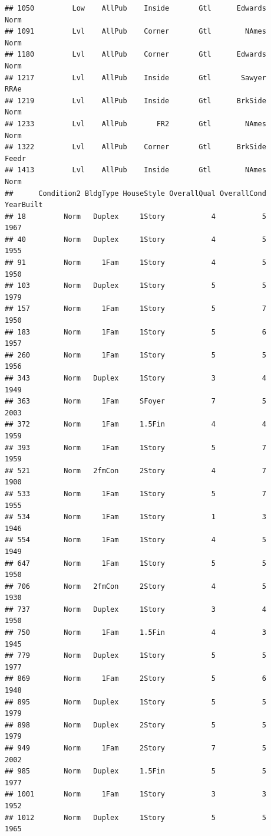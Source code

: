 \documentclass[]{article}
\begin{document}
\begin{verbatim}
## 1050         Low    AllPub    Inside       Gtl      Edwards       Norm
## 1091         Lvl    AllPub    Corner       Gtl        NAmes       Norm
## 1180         Lvl    AllPub    Corner       Gtl      Edwards       Norm
## 1217         Lvl    AllPub    Inside       Gtl       Sawyer       RRAe
## 1219         Lvl    AllPub    Inside       Gtl      BrkSide       Norm
## 1233         Lvl    AllPub       FR2       Gtl        NAmes       Norm
## 1322         Lvl    AllPub    Corner       Gtl      BrkSide      Feedr
## 1413         Lvl    AllPub    Inside       Gtl        NAmes       Norm
##      Condition2 BldgType HouseStyle OverallQual OverallCond YearBuilt
## 18         Norm   Duplex     1Story           4           5      1967
## 40         Norm   Duplex     1Story           4           5      1955
## 91         Norm     1Fam     1Story           4           5      1950
## 103        Norm   Duplex     1Story           5           5      1979
## 157        Norm     1Fam     1Story           5           7      1950
## 183        Norm     1Fam     1Story           5           6      1957
## 260        Norm     1Fam     1Story           5           5      1956
## 343        Norm   Duplex     1Story           3           4      1949
## 363        Norm     1Fam     SFoyer           7           5      2003
## 372        Norm     1Fam     1.5Fin           4           4      1959
## 393        Norm     1Fam     1Story           5           7      1959
## 521        Norm   2fmCon     2Story           4           7      1900
## 533        Norm     1Fam     1Story           5           7      1955
## 534        Norm     1Fam     1Story           1           3      1946
## 554        Norm     1Fam     1Story           4           5      1949
## 647        Norm     1Fam     1Story           5           5      1950
## 706        Norm   2fmCon     2Story           4           5      1930
## 737        Norm   Duplex     1Story           3           4      1950
## 750        Norm     1Fam     1.5Fin           4           3      1945
## 779        Norm   Duplex     1Story           5           5      1977
## 869        Norm     1Fam     2Story           5           6      1948
## 895        Norm   Duplex     1Story           5           5      1979
## 898        Norm   Duplex     2Story           5           5      1979
## 949        Norm     1Fam     2Story           7           5      2002
## 985        Norm   Duplex     1.5Fin           5           5      1977
## 1001       Norm     1Fam     1Story           3           3      1952
## 1012       Norm   Duplex     1Story           5           5      1965

\end{verbatim}
\end{document}
